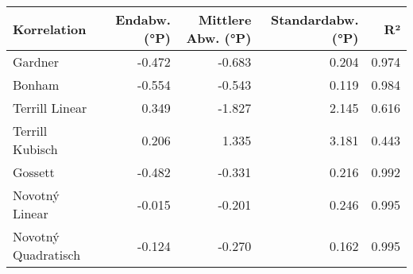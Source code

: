 \begin{tabular}{lrrrr}
\toprule
        Korrelation &  Endabw. (°P) &  Mittlere Abw. (°P) &  Standardabw. (°P) &    R² \\
\midrule
            Gardner &        -0.472 &              -0.683 &              0.204 & 0.974 \\
             Bonham &        -0.554 &              -0.543 &              0.119 & 0.984 \\
     Terrill Linear &         0.349 &              -1.827 &              2.145 & 0.616 \\
    Terrill Kubisch &         0.206 &               1.335 &              3.181 & 0.443 \\
            Gossett &        -0.482 &              -0.331 &              0.216 & 0.992 \\
     Novotný Linear &        -0.015 &              -0.201 &              0.246 & 0.995 \\
Novotný Quadratisch &        -0.124 &              -0.270 &              0.162 & 0.995 \\
\bottomrule
\end{tabular}
